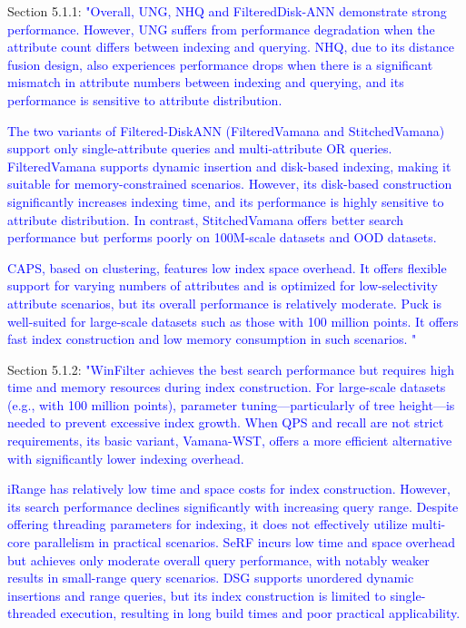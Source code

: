 \documentclass[sigconf, nonacm]{acmart}
\begin{document}
Section 5.1.1:\textcolor{blue}{
	"Overall, UNG, NHQ and FilteredDisk-ANN demonstrate strong performance. However, UNG suffers from performance degradation when the attribute count differs between indexing and querying. NHQ, due to its distance fusion design, also experiences performance drops when there is a significant mismatch in attribute numbers between indexing and querying, and its performance is sensitive to attribute distribution. }

\textcolor{blue}{The two variants of Filtered-DiskANN (FilteredVamana and StitchedVamana) support only single-attribute queries and multi-attribute OR queries. FilteredVamana supports dynamic insertion and disk-based indexing, making it suitable for memory-constrained scenarios. However, its disk-based construction significantly increases indexing time, and its performance is highly sensitive to attribute distribution. In contrast, StitchedVamana offers better search performance but performs poorly on 100M-scale datasets and OOD datasets.}

\textcolor{blue}{
	CAPS, based on clustering, features low index space overhead. It offers flexible support for varying numbers of attributes and is optimized for low-selectivity attribute scenarios, but its overall performance is relatively moderate.
	Puck is well-suited for large-scale datasets such as those with 100 million points. It offers fast index construction and low memory consumption in such scenarios. "}


Section 5.1.2: \textcolor{blue}{
	"WinFilter achieves the best search performance but requires high time and memory resources during index construction. For large-scale datasets (e.g., with 100 million points), parameter tuning—particularly of tree height—is needed to prevent excessive index growth. When QPS and recall are not strict requirements, its basic variant, Vamana-WST, offers a more efficient alternative with significantly lower indexing overhead.
}

\textcolor{blue}{
	iRange has relatively low time and space costs for index construction. However, its search performance declines significantly with increasing query range. Despite offering threading parameters for indexing, it does not effectively utilize multi-core parallelism in practical scenarios.
	SeRF incurs low time and space overhead but achieves only moderate overall query performance, with notably weaker results in small-range query scenarios.
	DSG supports unordered dynamic insertions and range queries, but its index construction is limited to single-threaded execution, resulting in long build times and poor practical applicability.}
\end{document}
